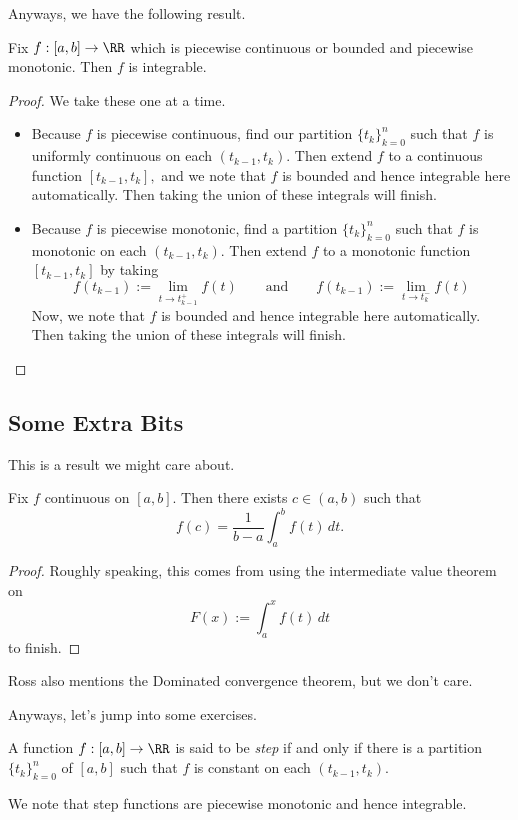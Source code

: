 Anyways, we have the following result.
\begin{proposition}
	Fix $f:[a,b]\to\RR$ which is piecewise continuous or bounded and piecewise monotonic. Then $f$ is integrable.
\end{proposition}
\begin{proof}
	We take these one at a time.
	\begin{itemize}
		\item Because $f$ is piecewise continuous, find our partition $\{t_k\}_{k=0}^n$ such that $f$ is uniformly continuous on each $(t_{k-1},t_k).$ Then extend $f$ to a continuous function $[t_{k-1},t_k],$ and we note that $f$ is bounded and hence integrable here automatically. Then taking the union of these integrals will finish.
		\item Because $f$ is piecewise monotonic, find a partition $\{t_k\}_{k=0}^n$ such that $f$ is monotonic on each $(t_{k-1},t_k).$ Then extend $f$ to a monotonic function $[t_{k-1},t_k]$ by taking
		\[f(t_{k-1}):=\lim_{t\to t_{k-1}^+}f(t)\qquad\text{and}\qquad f(t_{k-1}):=\lim_{t\to t_{k}^-}f(t)\]
		Now, we note that $f$ is bounded and hence integrable here automatically. Then taking the union of these integrals will finish.
		\qedhere
	\end{itemize}
\end{proof}

\subsection{Some Extra Bits}
This is a result we might care about.
\begin{theorem}
	Fix $f$ continuous on $[a,b].$ Then there exists $c\in(a,b)$ such that
	\[f(c)=\frac1{b-a}\int_a^bf(t)\,dt.\]
\end{theorem}
\begin{proof}
	Roughly speaking, this comes from using the intermediate value theorem on
	\[F(x):=\int_a^xf(t)\,dt\]
	to finish.
\end{proof}
Ross also mentions the Dominated convergence theorem, but we don't care.

Anyways, let's jump into some exercises.
\begin{definition}[Step]
	A function $f:[a,b]\to\RR$ is said to be \textit{step} if and only if there is a partition $\{t_k\}_{k=0}^n$ of $[a,b]$ such that $f$ is constant on each $(t_{k-1},t_k).$
\end{definition}
We note that step functions are piecewise monotonic and hence integrable.

